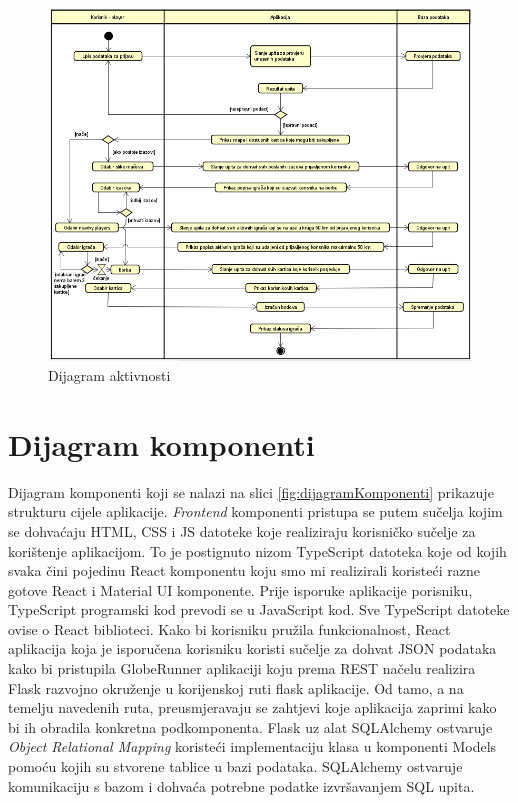 			 \begin{figure}[H]
        			\includegraphics[width=\textwidth]{slike/dijagramAktivnosti.png}
        			\centering
        			\caption{Dijagram aktivnosti}
        			\label{fig:ActivityDiagram}
        		\end{figure}
			
			\eject
			
		\section{Dijagram komponenti}
			 
			 Dijagram komponenti koji se nalazi na slici \ref{fig:dijagramKomponenti} prikazuje strukturu cijele aplikacije. \textit{Frontend} komponenti pristupa se putem sučelja kojim se dohvaćaju HTML, CSS i JS datoteke koje realiziraju korisničko sučelje za korištenje aplikacijom. To je postignuto nizom TypeScript datoteka koje od kojih svaka čini pojedinu React komponentu koju smo mi realizirali koristeći razne gotove React i Material UI komponente. Prije isporuke aplikacije porisniku, TypeScript programski kod prevodi se u JavaScript kod. Sve TypeScript datoteke ovise o React biblioteci. Kako bi korisniku pružila funkcionalnost, React aplikacija koja je isporučena korisniku koristi sučelje za dohvat JSON podataka kako bi pristupila GlobeRunner aplikaciji koju prema REST načelu realizira Flask razvojno okruženje u korijenskoj ruti flask aplikacije. Od tamo, a na temelju navedenih ruta, preusmjeravaju se zahtjevi koje aplikacija zaprimi kako bi ih obradila konkretna podkomponenta. Flask uz alat SQLAlchemy ostvaruje \textit{Object Relational Mapping} koristeći implementaciju klasa u komponenti Models pomoću kojih su stvorene tablice u bazi podataka. SQLAlchemy ostvaruje komunikaciju s bazom i dohvaća potrebne podatke izvršavanjem SQL upita.
			 
